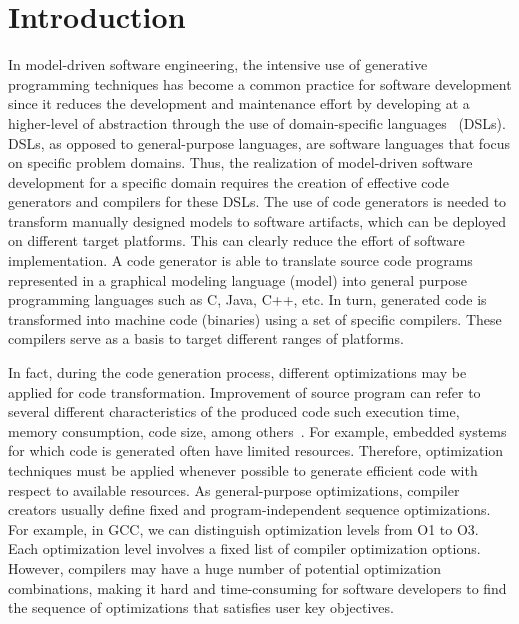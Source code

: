 \section{Introduction}
In model-driven software engineering, the intensive use of generative programming techniques has become a common practice for software development since it reduces the development and maintenance effort by developing at a higher-level of abstraction through the use of domain-specific languages~\cite{brambilla2012model} (DSLs). 
DSLs, as opposed to general-purpose languages, are software languages that focus on specific problem domains. Thus, the realization of model-driven software development for a specific domain requires the creation of effective code generators and compilers for these DSLs.
The use of code generators is needed to transform manually designed models to software artifacts, which can be deployed on different target platforms. This can clearly reduce the effort of software implementation. A code generator is able to translate source code programs represented in a graphical modeling language (model) into general purpose programming languages such as C, Java, C++, etc. In turn, generated code is transformed into machine code (binaries) using a set of specific compilers.
These compilers serve as a basis to target different ranges of platforms. 

In fact, during the code generation process, different optimizations may be applied for code transformation. Improvement of source program can refer to several different characteristics of the produced code such execution time, memory consumption, code size, among others~\cite{almagor2004finding,pan2006fast}.
For example, embedded systems for which code is generated often have limited resources. 
Therefore, optimization techniques must be applied whenever possible to generate efficient code with respect to available resources\cite{nagiub2013automatic}. 
As general-purpose optimizations, compiler creators usually define fixed and program-independent sequence optimizations.
For example, in GCC, we can distinguish optimization levels from O1 to O3. Each optimization level involves a fixed list of compiler optimization options. 
However, compilers may have a huge number of potential optimization combinations, making it hard and time-consuming for software developers to find the sequence of optimizations that satisfies user key objectives. 


